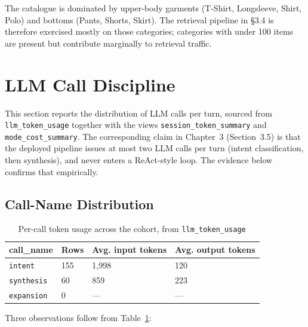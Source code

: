 The catalogue is dominated by upper-body garments (T-Shirt, Longsleeve, Shirt, Polo) and bottoms (Pants, Shorts, Skirt). The retrieval pipeline in §3.4 is therefore exercised mostly on those categories; categories with under 100 items are present but contribute marginally to retrieval traffic.




\section{LLM Call Discipline}
\label{sec:llm_call_discipline}

This section reports the distribution of LLM calls per turn, sourced from \texttt{llm\_token\_usage} together with the views \texttt{session\_token\_summary} and \texttt{mode\_cost\_summary}. The corresponding claim in Chapter~3 (Section~3.5) is that the deployed pipeline issues at most two LLM calls per turn (intent classification, then synthesis), and never enters a ReAct-style loop. The evidence below confirms that empirically.

\subsection{Call-Name Distribution}
\label{subsec:call_name_distribution}

\begin{table}[H]
\centering
\begin{tabular}{p{3cm}p{2.5cm}p{3.5cm}p{3.5cm}}
\toprule
\textbf{call\_name} & \textbf{Rows} & \textbf{Avg. input tokens} & \textbf{Avg. output tokens}\\
\midrule
\texttt{intent}    & 155 & 1{,}998 & 120\\
\texttt{synthesis} & 60  & 859     & 223\\
\texttt{expansion} & 0   & ---     & ---\\
\bottomrule
\end{tabular}
\caption{Per-call token usage across the cohort, from \texttt{llm\_token\_usage}}
\label{tab:call_name_distribution}
\end{table}

Three observations follow from Table~\ref{tab:call_name_distribution}:

